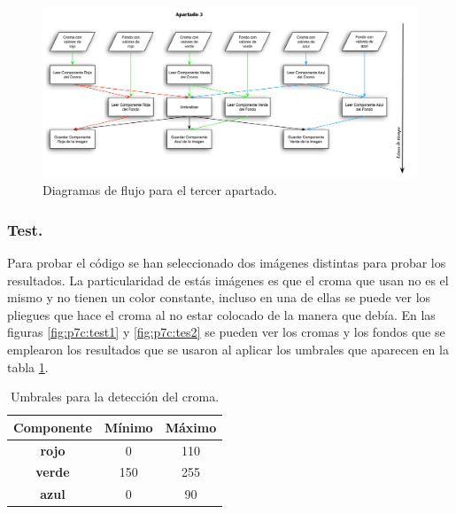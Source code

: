 \documentclass{article}
\begin{document}
\begin{figure}[h]
  \centering
    \includegraphics[width=1\textwidth]{img/p7c_paralelizacion.pdf}
  \caption{Diagramas de flujo para el tercer apartado.}
  \label{fig:p7c:paralelizacion}
\end{figure}

\subsubsection{Test.}

	Para probar el código se han seleccionado dos imágenes distintas para probar los resultados. La particularidad de estás imágenes es que el croma que usan no es el mismo y no tienen un color constante, incluso en una de ellas se puede ver los pliegues que hace el croma al no estar colocado de la manera que debía. En las figuras \ref{fig:p7c:test1} y \ref{fig:p7c:tes2} se pueden ver los cromas y los fondos que se emplearon los resultados que se usaron al aplicar los umbrales que aparecen en la tabla \ref{tab:p7c:umbrales}.

\begin{table}
	\begin{center}
		\begin{tabular}{|c|c|c|}
\hline
\textbf{Componente} & \textbf{Mínimo} & \textbf{Máximo} \\ \hline \hline
\textbf{rojo}  &   0 & 110 \\ \hline
\textbf{verde} & 150 & 255 \\ \hline
\textbf{azul}  &   0 &  90 \\ \hline
		\end{tabular}
		\caption{Umbrales para la detección del croma.}
		\label{tab:p7c:umbrales}
	\end{center}
\end{table}
\end{document}
